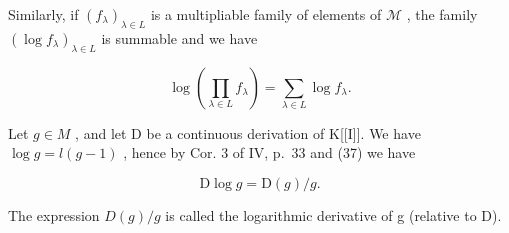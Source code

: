 Similarly, if \((f_{\lambda})_{\lambda \in L}\) is a multipliable family of elements of \(\mathcal{M}\) , the family \((\log f_{\lambda})_{\lambda \in L}\) is summable and we have

\[
\log \left(\prod_ {\lambda \in L} f _ {\lambda}\right) = \sum_ {\lambda \in L} \log f _ {\lambda}.\tag{41}
\]

Let \(g \in M\) , and let D be a continuous derivation of K{[}{[}I{]}{]}. We have \(\log g = l(g - 1)\) , hence by Cor. 3 of IV, p.~33 and (37) we have

\[
\mathrm{D} \log g = \mathrm{D} (g) / g.\tag{42}
\]

The expression \(D(g)/g\) is called the logarithmic derivative of g (relative to D).

